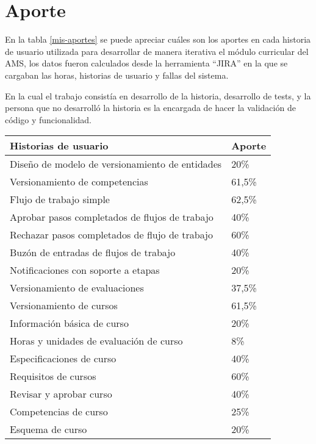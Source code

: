 \section{Aporte}
En la tabla \ref{mis-aportes} se puede apreciar cuáles son los aportes en cada historia de usuario utilizada para desarrollar de manera iterativa el módulo curricular del AMS, los datos fueron calculados desde la herramienta \enquote{JIRA} en la que se cargaban las horas, historias de usuario y fallas del sistema.

En la cual el trabajo consistía en desarrollo de la historia, desarrollo de tests, y la persona que no desarrolló la historia es la encargada de hacer la validación de código y funcionalidad.

\begin{table}[H]
\centering
\begin{tabular}{@{}ll@{}}
\toprule
Historias de usuario                                & Aporte \\ \midrule
Diseño de modelo de versionamiento de entidades     &  20\%  \\
Versionamiento de competencias                      & 61,5\% \\
Flujo de trabajo simple                             & 62,5\% \\
Aprobar pasos completados de flujos de trabajo      &  40\%  \\
Rechazar pasos completados de flujo de trabajo      &  60\%  \\
Buzón de entradas de flujos de trabajo              &  40\%  \\
Notificaciones con soporte a etapas                 &  20\%  \\
Versionamiento de evaluaciones                      & 37,5\% \\
Versionamiento de cursos                            & 61,5\% \\
Información básica de curso                         &  20\%  \\
Horas y unidades de evaluación de curso             &   8\%  \\
Especificaciones de curso                           &  40\%  \\
Requisitos de cursos                                &  60\%  \\
Revisar y aprobar curso                             &  40\%  \\
Competencias de curso                               &  25\%  \\
Esquema de curso                                    &  20\%  \\

\end{tabular}
\end{table}
